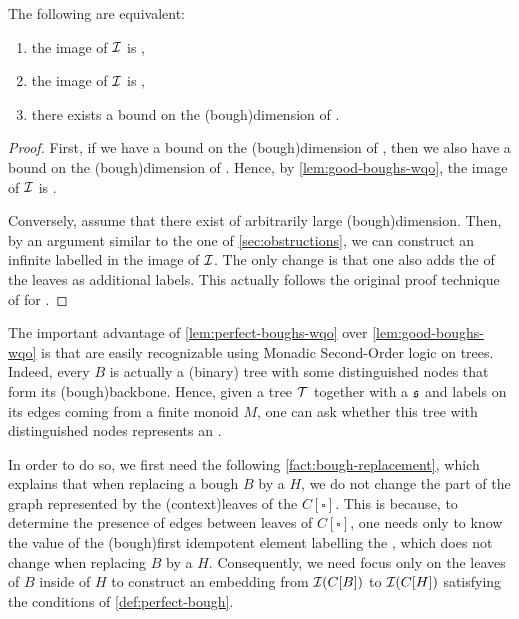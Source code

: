\begin{lemma}
  \label{lem:perfect-boughs-wqo} The following are equivalent:
  \begin{enumerate}
    \item the image of $\mathcal{I}$ is ,
    \item the image of $\mathcal{I}$ is ,
    \item there exists a bound on the \kl(bough){dimension} of .
  \end{enumerate}
\end{lemma}
\begin{proof}
  First, if we have a bound on the \kl(bough){dimension} of ,
  then we also have a bound on the \kl(bough){dimension} of .
  Hence, by \cref{lem:good-boughs-wqo}, the image of $\mathcal{I}$ is
  .

  Conversely, assume that there exist  of arbitrarily
  large \kl(bough){dimension}. Then, by an argument similar to the one of 
  \cref{sec:obstructions}, we can construct an infinite
  labelled  in the image of $\mathcal{I}$. The only change is that 
  one also adds the  of the leaves as additional labels.
  This actually follows the original proof technique of 
  \cite{LOPEZ24} for .
\end{proof}

The important advantage of \cref{lem:perfect-boughs-wqo} over
\cref{lem:good-boughs-wqo} is that  are easily
recognizable using Monadic Second-Order logic on trees. Indeed, every
 $B$ is actually a (binary) tree with some distinguished nodes that
form its \kl(bough){backbone}. Hence, given a tree $\t$ together with a
 $\mathfrak{s}$ and labels on its edges coming from a finite monoid $M$, one
can ask whether this tree with distinguished nodes represents an .

In order to do so, we first need the following
\cref{fact:bough-replacement}, which explains that when replacing a bough $B$ by
a  $H$, we do not change the part of the graph
represented by the \kl(context){leaves} of the  $C[\square]$.
This is because, to determine the presence of edges between leaves of
$C[\square]$, one needs only to know the value of the \kl(bough){first
idempotent element} labelling the , which does not change when
replacing $B$ by a  $H$. Consequently, we need
focus only on the leaves of $B$ inside of $H$ to construct an embedding from
$\mathcal{I}(C[B])$ to $\mathcal{I}(C[H])$ satisfying the conditions of
\cref{def:perfect-bough}.
	

